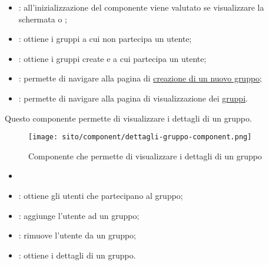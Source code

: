 
\begin{itemize}
    \item {}: all'inizializzazione del componente viene valutato se visualizzare la schermata  o ;
    \item {}: ottiene i gruppi a cui non partecipa un utente;
    \item {}:  ottiene i gruppi create e a cui partecipa un utente;
    \item {}: permette di navigare alla pagina di \hyperref[par:Crea nuovo gruppo]{creazione di un nuovo gruppo};
    \item {}: permette di navigare alla pagina di visualizzazione dei \hyperref[par:Gruppi]{gruppi}.
\end{itemize}



\label{par:CrewDetail}
Questo componente permette di visualizzare i dettagli di un gruppo.  
\begin{figure}[H] 
    \centering 
    \texttt{[image: sito/component/dettagli-gruppo-component.png]} 
    \caption{Componente che permette di visualizzare i dettagli di un gruppo}
\end{figure}
\begin{itemize}
    \item {}
\end{itemize}


\begin{itemize}
    \item {}: ottiene gli utenti che partecipano al gruppo;
    \item {}: aggiunge l'utente ad un gruppo;
    \item {}: rimuove l'utente da un gruppo;
    \item {}: ottiene i dettagli di un gruppo.
\end{itemize}



